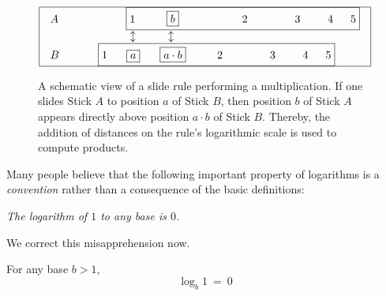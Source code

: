 \begin{figure}[htb]
\[ 
\begin{array}{|c|}
\hline
\begin{array}{ll}
A \hspace*{.35in} &
\hspace*{.35in}
\fbox{$1$ \hspace*{.3in} \fbox{$b$} 
\hspace*{.7in} $2$ 
\hspace*{.5in} $3$ 
\hspace*{.25in} $4$ 
\hspace*{.125in} $5$} \\ 
  &
\hspace*{.4in} \updownarrow \hspace*{.41in} \updownarrow \\
B \hspace*{.35in} &
\fbox{$1$\hspace*{.24in}\fbox{$a$}\hspace*{.25in}\fbox{$a \cdot b$}
\hspace*{.3in} $2$ 
\hspace*{.5in} $3$ 
\hspace*{.25in} $4$ 
\hspace*{.125in} $5$}
\end{array}
 \\
\hline
\end{array}
\]
\caption{A schematic view of a slide rule performing a multiplication.  If one slides Stick $A$ to position $a$ of Stick $B$, then position $b$ of Stick $A$ appears directly above position $a \cdot b$ of Stick $B$.  Thereby, the addition of distances on the rule's logarithmic scale is used to compute products.}
\label{fig:slide-rule}
\end{figure}


\bigskip

\noindent
Many people believe that the following important property of logarithms is a {\em convention} rather than a consequence of the basic definitions:
\smallskip

 {\em The logarithm of $1$ to any base is $0$.}

\smallskip

\noindent We correct this misapprehension now.

\smallskip

\begin{prop}
\label{thm:log1=0}
For any base $b >1$,
\[ \log_b 1 \ = \ 0 \]
\end{prop}


